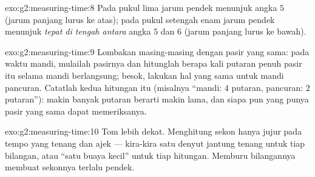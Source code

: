 \begin{solution}{exo:g2:measuring-time:8}
Pada pukul lima jarum pendek menunjuk angka $5$ (jarum panjang lurus
ke atas); pada pukul setengah enam jarum pendek menunjuk
\emph{tepat di tengah antara} angka $5$ dan $6$ (jarum panjang lurus
ke bawah).
\end{solution}

\begin{solution}{exo:g2:measuring-time:9}
Lombakan masing-masing dengan  pasir yang sama: pada waktu mandi,
mulailah  pasirnya dan hitunglah berapa kali putaran penuh 
pasir itu selama mandi berlangsung; besok, lakukan hal yang sama untuk
mandi pancuran. Catatlah kedua hitungan itu (misalnya ``mandi: $4$
putaran, pancuran: $2$ putaran''): makin banyak putaran berarti makin
lama, dan siapa pun yang punya  pasir yang sama dapat memeriksanya.
\end{solution}

\begin{solution}{exo:g2:measuring-time:10}
Tom lebih dekat. Menghitung sekon hanya jujur pada tempo yang tenang
dan ajek --- kira-kira satu denyut jantung tenang untuk tiap bilangan,
atau ``satu buaya kecil'' untuk tiap hitungan. Memburu bilangannya
membuat sekonnya terlalu pendek.
\end{solution}
